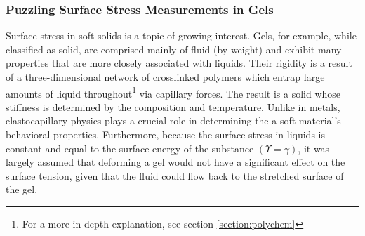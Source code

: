 
\subsubsection{Puzzling Surface Stress Measurements in Gels}
Surface stress in soft solids is a topic of growing interest. Gels, for example, while classified as solid, are comprised mainly of fluid (by weight) and exhibit many properties that are more closely associated with liquids. Their rigidity is a result of a three-dimensional network of crosslinked polymers which entrap large amounts of liquid throughout\footnote{For a more in depth explanation, see section \ref{section:polychem}} via capillary forces. The result is a solid whose stiffness is determined by the composition and temperature.  Unlike in metals, elastocapillary physics plays a crucial role in determining the a soft material's behavioral properties. Furthermore, because the surface stress in liquids is constant and equal to the surface energy of the substance $(\Upsilon = \gamma)$, it was largely assumed that deforming a gel would not have a significant effect on the surface tension, given that the fluid could flow back to the stretched surface of the gel. 

